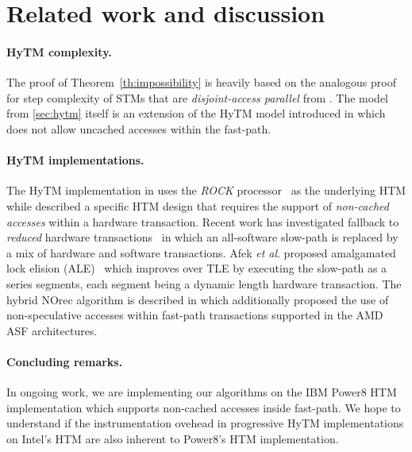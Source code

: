 \section{Related work and discussion}
\label{sec:rel}
%
\paragraph{HyTM complexity.}
The proof of Theorem~\ref{th:impossibility} is heavily based on the analogous proof for step complexity of
STMs that are \emph{disjoint-access parallel} from \cite{prog15-pact}.
The model from \cref{sec:hytm} itself is an extension of the HyTM model introduced in \cite{hytm14disc}
which does not allow uncached accesses within the fast-path.

\paragraph{HyTM implementations.}
The HyTM implementation in \cite{damronhytm} uses the \emph{ROCK} processor~\cite{rock} as the underlying HTM
while \cite{kumarhytm} described a specific HTM design that requires the support of \emph{non-cached accesses}
within a hardware transaction. 
Recent work has investigated fallback to \emph{reduced} hardware transactions~\cite{MS13}
in which an all-software slow-path is replaced by a mix of hardware and software transactions. 
Afek \emph{et al}. proposed amalgamated lock elision (ALE)~\cite{ale15} which improves over TLE
by executing the slow-path as a series segments, each segment being a dynamic length hardware transaction.
The hybrid NOrec algorithm is described in \cite{hynorecriegel} which additionally proposed the use of non-speculative accesses
within fast-path transactions supported in the AMD ASF architectures.

\paragraph{Concluding remarks.}
In ongoing work, we are implementing our algorithms on the IBM Power8 HTM implementation which supports
non-cached accesses inside fast-path. We hope to understand if the instrumentation ovehead in
progressive HyTM implementations on Intel's HTM are also inherent to Power8's HTM implementation.